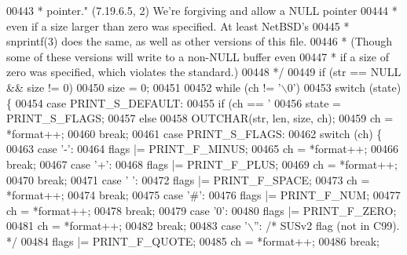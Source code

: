 \begin{DoxyCode}
{00443 \textcolor{comment}{     * pointer." (7.19.6.5, 2)  We're forgiving and allow a NULL pointer}
00444 \textcolor{comment}{     * even if a size larger than zero was specified.  At least NetBSD's}
00445 \textcolor{comment}{     * snprintf(3) does the same, as well as other versions of this file.}
00446 \textcolor{comment}{     * (Though some of these versions will write to a non-NULL buffer even}
00447 \textcolor{comment}{     * if a size of zero was specified, which violates the standard.)}
00448 \textcolor{comment}{     */}
00449     \textcolor{keywordflow}{if} (str == NULL && size != 0)
00450         size = 0;
00451 
00452     \textcolor{keywordflow}{while} (ch != \textcolor{charliteral}{'\(\backslash\)0'})
00453         \textcolor{keywordflow}{switch} (state) \{
00454         \textcolor{keywordflow}{case} PRINT\_S\_DEFAULT:
00455             \textcolor{keywordflow}{if} (ch == \textcolor{charliteral}{'%
00456                 state = PRINT\_S\_FLAGS;
00457             \textcolor{keywordflow}{else}
00458                 OUTCHAR(str, len, size, ch);
00459             ch = *format++;
00460             \textcolor{keywordflow}{break};
00461         \textcolor{keywordflow}{case} PRINT\_S\_FLAGS:
00462             \textcolor{keywordflow}{switch} (ch) \{
00463             \textcolor{keywordflow}{case} \textcolor{charliteral}{'-'}:
00464                 flags |= PRINT\_F\_MINUS;
00465                 ch = *format++;
00466                 \textcolor{keywordflow}{break};
00467             \textcolor{keywordflow}{case} \textcolor{charliteral}{'+'}:
00468                 flags |= PRINT\_F\_PLUS;
00469                 ch = *format++;
00470                 \textcolor{keywordflow}{break};
00471             \textcolor{keywordflow}{case} \textcolor{charliteral}{' '}:
00472                 flags |= PRINT\_F\_SPACE;
00473                 ch = *format++;
00474                 \textcolor{keywordflow}{break};
00475             \textcolor{keywordflow}{case} \textcolor{charliteral}{'#'}:
00476                 flags |= PRINT\_F\_NUM;
00477                 ch = *format++;
00478                 \textcolor{keywordflow}{break};
00479             \textcolor{keywordflow}{case} \textcolor{charliteral}{'0'}:
00480                 flags |= PRINT\_F\_ZERO;
00481                 ch = *format++;
00482                 \textcolor{keywordflow}{break};
00483             \textcolor{keywordflow}{case} \textcolor{charliteral}{'\(\backslash\)''}:  \textcolor{comment}{/* SUSv2 flag (not in C99). */}
00484                 flags |= PRINT\_F\_QUOTE;
00485                 ch = *format++;
00486                 \textcolor{keywordflow}{break};
}}
\end{DoxyCode}

